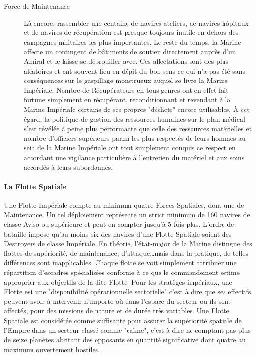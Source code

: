 \documentclass[twoside]{article}
\begin{document}
\begin{description}
	\item[Force de Maintenance] Là encore, rassembler une centaine de navires ateliers, de navires hôpitaux et de navires de récupération est presque toujours inutile en dehors des campagnes militaires les plus importantes. Le reste du temps, la Marine affecte un contingent de bâtiments de soutien directement auprès d'un Amiral et le laisse se débrouiller avec. Ces affectations sont des plus aléatoires et ont souvent lieu en dépit du bon sens ce qui n'a pas été sans conséquences sur le gaspillage monstrueux auquel se livre la Marine Impériale. Nombre de Récupérateurs en tous genres ont en effet fait fortune simplement en récupérant, reconditionnant et revendant à la Marine Impériale certains de ses propres "déchets" encore utilisables. À cet égard, la politique de gestion des ressources humaines sur le plan médical s'est révélée à peine plus performante que celle des ressources matérielles et nombre d'officiers supérieurs parmi les plus respectés de leurs hommes au sein de la Marine Impériale ont tout simplement conquis ce respect en accordant une vigilance particulière à l'entretien du matériel et aux soins accordés à leurs subordonnés.
\end{description}

\paragraph{La Flotte Spatiale}
Une Flotte Impériale compte au minimum quatre Forces Spatiales, dont une de Maintenance. Un tel déploiement représente un strict minimum de 160 navires de classe Aviso ou supérieure et peut en compter jusqu'à 5 fois plus. L'ordre de bataille impose qu'au moins six des navires d'une Flotte Spatiale soient des Destroyers de classe Impériale. En théorie, l'état-major de la Marine distingue des flottes de supériorité, de maintenance, d'attaque\ldots mais dans la pratique, de telles différences sont inapplicables. Chaque flotte se voit simplement attribuer une répartition d'escadres spécialisées conforme à ce que le commandement estime approprier aux objectifs de la dite Flotte. Pour les stratèges impériaux, une Flotte est une "disponibilité opérationnelle sectorielle" c'est à dire que ses effectifs peuvent avoir à intervenir n'importe où dans l'espace du secteur ou ils sont affectés, pour des missions de nature et de durée très variables. Une Flotte Spatiale est considérée comme suffisante pour assurer la supériorité spatiale de l'Empire dans un secteur classé comme "calme", c'est à dire ne comptant pas plus de seize planètes abritant des opposants en quantité significative dont quatre au maximum ouvertement hostiles.\\
\end{document}
